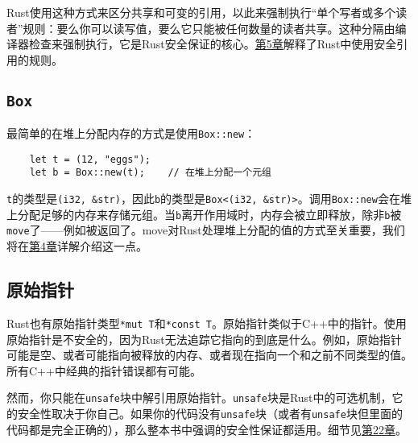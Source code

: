 
Rust使用这种方式来区分共享和可变的引用，以此来强制执行“单个写者或多个读者”规则：要么你可以读写值，要么它只能被任何数量的读者共享。这种分隔由编译器检查来强制执行，它是Rust安全保证的核心。\hyperref[ch05]{第5章}解释了Rust中使用安全引用的规则。

\subsection{\texttt{Box}}

最简单的在堆上分配内存的方式是使用\texttt{Box::new}：
\begin{verbatim}
    let t = (12, "eggs");
    let b = Box::new(t);    // 在堆上分配一个元组
\end{verbatim}

\texttt{t}的类型是\texttt{(i32, \&str)}，因此\texttt{b}的类型是\texttt{Box<(i32, \&str)>}。调用\texttt{Box::new}会在堆上分配足够的内存来存储元组。当\texttt{b}离开作用域时，内存会被立即释放，除非\texttt{b}被\texttt{move}了——例如被返回了。move对Rust处理堆上分配的值的方式至关重要，我们将在\hyperref[ch04]{第4章}详解介绍这一点。

\subsection{原始指针}

Rust也有原始指针类型\texttt{*mut T}和\texttt{*const T}。原始指针类似于C++中的指针。使用原始指针是不安全的，因为Rust无法追踪它指向的到底是什么。例如，原始指针可能是空、或者可能指向被释放的内存、或者现在指向一个和之前不同类型的值。所有C++中经典的指针错误都有可能。

然而，你只能在\texttt{unsafe}块中解引用原始指针。\texttt{unsafe}块是Rust中的可选机制，它的安全性取决于你自己。如果你的代码没有\texttt{unsafe}块（或者有\texttt{unsafe}块但里面的代码都是完全正确的），那么整本书中强调的安全性保证都适用。细节见\hyperref[ch22]{第22章}。

